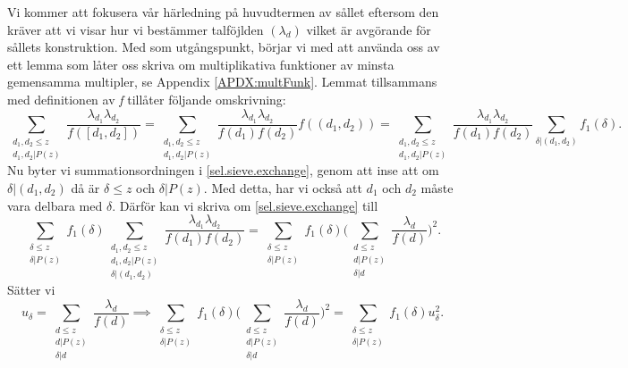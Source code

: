 Vi kommer att fokusera vår härledning på huvudtermen av sållet eftersom den kräver att vi visar hur vi bestämmer talföjlden \((\lambda_d)\) vilket är avgörande för sållets konstruktion.
 Med \cite[s. 120]{cojocarumurty} som utgångspunkt, börjar vi med att använda
 oss av ett lemma som låter oss skriva om multiplikativa funktioner av minsta gemensamma multipler, se Appendix \ref{APDX:multFunk}.
Lemmat tillsammans med definitionen av \textit{f} tillåter följande omskrivning:
\begin{equation}
    \sum_{\substack{d_1,d_2\leq z\\d_1,d_2|P(z)}}\frac{\lambda_{d_1}\lambda_{d_2}}{f([d_1,d_2])} = \sum_{\substack{d_1,d_2\leq z\\d_1,d_2|P(z)}}\frac{\lambda_{d_1}\lambda_{d_2}}{f(d_1)f(d_2)}f((d_1,d_2)) = \sum_{\substack{d_1,d_2\leq z\\d_1,d_2|P(z)}}\frac{\lambda_{d_1}\lambda_{d_2}}{f(d_1)f(d_2)}\sum_{\delta|(d_1,d_2)}f_1(\delta).\label{sel.sieve.exchange}
\end{equation}
Nu byter vi summationsordningen i \eqref{sel.sieve.exchange}, genom att inse att om \(\delta|(d_1,d_2)\) då är \(\delta \leq z\) och \(\delta | P(z)\).
Med detta, har vi också att \(d_1\) och \(d_2\) måste vara delbara med \(\delta\). Därför kan vi skriva om \eqref{sel.sieve.exchange} till
\begin{equation}
    \sum_{\substack{\delta \leq z\\ \delta | P(z)}}f_1(\delta) \sum_{\substack{d_1,d_2\leq z\\d_1,d_2|P(z)\\\delta|(d_1,d_2)}}\frac{\lambda_{d_1}\lambda_{d_2}}{f(d_1)f(d_2)} = \sum_{\substack{\delta \leq z\\ \delta | P(z)}}f_1(\delta)\Bigg(\sum_{\substack{d\leq z\\d|P(z)\\\delta|d}}\frac{\lambda_d}{f(d)}\Bigg)^2.\nonumber
\end{equation}
Sätter vi 
\begin{equation}
u_\delta = \sum_{\substack{d\leq z \\ d|P(z) \\ \delta | d}} \frac{\lambda_d}{f(d)} \implies \sum_{\substack{\delta \leq z\\ \delta | P(z)}}f_1(\delta)\Bigg(\sum_{\substack{d\leq z\\d|P(z)\\\delta|d}}\frac{\lambda_d}{f(d)}\Bigg)^2 = \sum_{\substack{\delta \leq z\\ \delta | P(z)}}f_1(\delta) u_\delta^2\label{sel.sieve.uuu}.
\end{equation}
